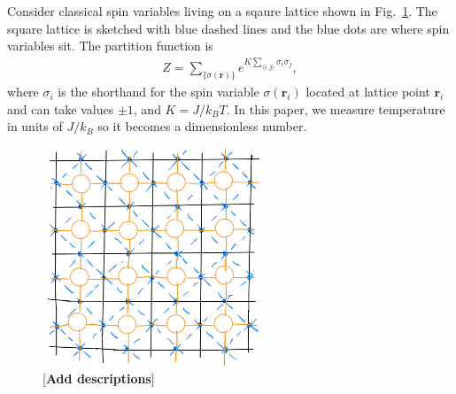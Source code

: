 \documentclass[aps,prb,reprint,superscriptaddress]{revtex4-2}
\begin{document}
Consider classical spin variables living on a sqaure lattice shown in
Fig.~\ref{fig:spin2tensor}. The square lattice is sketched with blue
dashed lines and the blue dots are where spin variables sit. The
partition function is
%
\begin{align}\label{eq:2DIsingZ}
    Z = \sum_{\{\sigma(\mathbf{r})\}}e^{K\sum_{\langle i,j
        \rangle}\sigma_i \sigma_j},
\end{align}
where $\sigma_i$ is the shorthand for the spin variable
$\sigma(\mathbf{r}_i)$ located at lattice point $\mathbf{r}_i$ and can
take values $\pm 1$, and $K = J / k_B T$. In this paper, we measure
temperature in units of $J / k_B $ so it becomes a dimensionless number.
\begin{figure}[htb]
    \includegraphics[width=6.5cm]{./figs/spin2tensor}
    \caption{\label{fig:spin2tensor}[\textbf{Add descriptions}]}
\end{figure}
%
\end{document}
